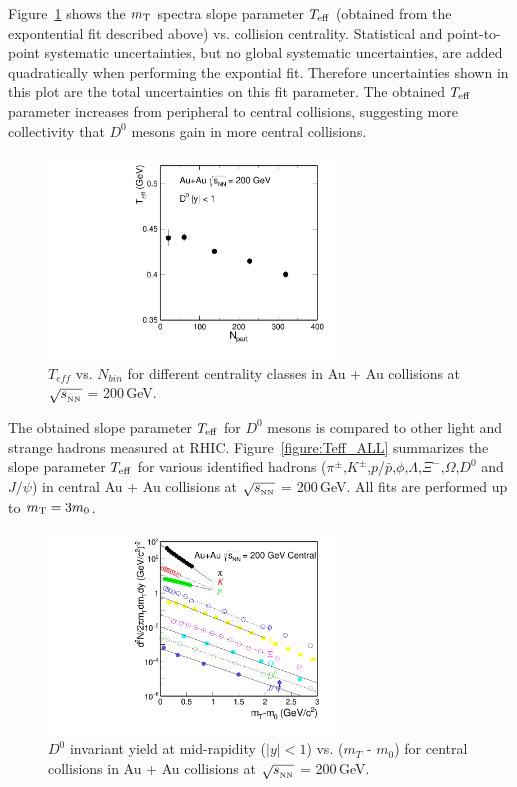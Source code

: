 Figure~\ref{figure:Teff_D0} shows the $m_{\rm T}$ spectra slope parameter $T_{\rm eff}$ (obtained from the expontential fit described above) vs. collision centrality. Statistical and point-to-point systematic uncertainties, but no global systematic uncertainties, are added quadratically when performing the expontial fit. Therefore uncertainties shown in this plot are the total uncertainties on this fit parameter. The obtained $T_{\rm eff}$ parameter increases from peripheral to central collisions, suggesting more collectivity that $D^0$ mesons gain in more central collisions. 

\begin{figure}
\centering
\includegraphics[width=0.68\textwidth]{figure/Run14_D0HFT/Teff_D0.pdf}
\caption{$T_{eff}$ vs. $N_{bin}$ for different centrality classes in Au + Au collisions at $\sqrt{s_{_{\rm NN}}}$ = 200\,GeV.}
\label{figure:Teff_D0} 
\end{figure}

The obtained slope parameter $T_{\rm eff}$ for $D^0$ mesons is compared to other light and strange hadrons measured at RHIC. %
Figure~\ref{figure:Teff_ALL} summarizes the slope parameter $T_{\rm eff}$ for various identified hadrons ($\pi^{\pm}$,$K^{\pm}$,$p$/$\bar{p}$,$\phi$,$\Lambda$,$\Xi^-$,$\Omega$,$D^0$ and $J/\psi$) in central Au + Au collisions at $\sqrt{s_{_{\rm NN}}}$ = 200\,GeV. All fits are performed up to $m_{\rm T} = 3m_{0}$.


\begin{figure}
\centering
\includegraphics[width=0.68\textwidth]{figure/Run14_D0HFT/mTFit_ALL.pdf}
\caption{$D^{0}$ invariant yield at mid-rapidity ($|y|<1$) vs. ($m_{T}$ - $m_{0}$) for central collisions in Au + Au collisions at $\sqrt{s_{_{\rm NN}}}$ = 200\,GeV.}
\label{figure:mTFit_ALL} 
\end{figure}

